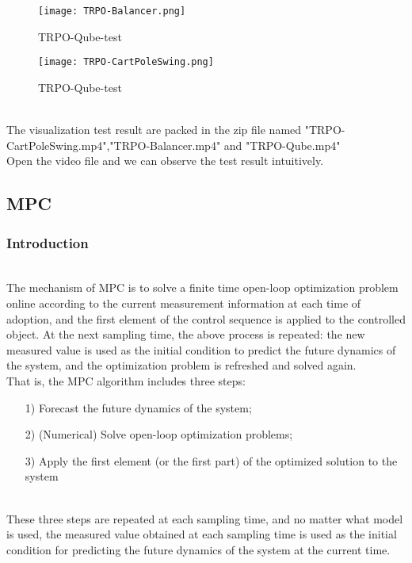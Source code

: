 \documentclass[12pt]{article}
\begin{document}
\begin{figure}[H]
    \centering
    \texttt{[image: TRPO-Balancer.png]}
    \caption{TRPO-Qube-test}
\end{figure}

\begin{figure}[H]
    \centering
    \texttt{[image: TRPO-CartPoleSwing.png]}
    \caption{TRPO-Qube-test}
\end{figure}

~\\\indent The visualization test result are packed in the zip file named "TRPO-CartPoleSwing.mp4","TRPO-Balancer.mp4" and "TRPO-Qube.mp4"
~\\\indent Open the video file and we can observe the test result intuitively.

\newpage
\subsection{MPC}

\subsubsection{Introduction}
~\\\indent The mechanism of MPC is to solve a finite time open-loop optimization problem online according to the current measurement information at each time of adoption, and the first element of the control sequence is applied to the controlled object. At the next sampling time, the above process is repeated: the new measured value is used as the initial condition to predict the future dynamics of the system, and the optimization problem is refreshed and solved again.
~\\\indent That is, the MPC algorithm includes three steps:
\begin{enumerate}
  \item [1)]Forecast the future dynamics of the system;
  \item [2)](Numerical) Solve open-loop optimization problems;
  \item [3)]Apply the first element (or the first part) of the optimized solution to the system
\end{enumerate}
~\\\indent These three steps are repeated at each sampling time, and no matter what model is used, the measured value obtained at each sampling time is used as the initial condition for predicting the future dynamics of the system at the current time.
\end{document}
